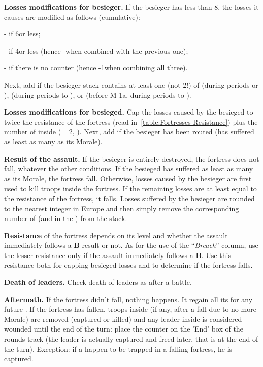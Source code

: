 \textbf{Losses modifications for besieger.} If the besieger has less than
8\LD, the losses it causes are modified as follows (cumulative):
\begin{modlist}
\item[-\texttu] if 6\LD or less;
\item[-\texttu] if 4\LD or less (hence -\texttd when combined with the
  previous one);
\item[-\texttd] if there is no \ARMY counter (hence -1\texttu when combining
  all three).
\end{modlist}
Next, add \texttd if the besieger stack contains at least one \ARMY\faceplus
(not 2\ARMY\facemoins !) of \POL (during periods  or ),
\RUS (during periods  to ), or \TUR \Janissaire (before
M-1a, during periods  to ).


\textbf{Losses modifications for besieged.} Cap the losses caused by the
besieged to twice the resistance of the fortress (read
in~\ref{table:Fortresses Resistance}) plus the number of \LD inside
(\ARMY\facemoins = 2\LD, \ARMY{}\LD). Next, add \texttd if the
besieger has been routed (has suffered as least as many \textetoile as its
Morale).

\textbf{Result of the assault.} If the besieger is entirely destroyed, the
fortress does not fall, whatever the other conditions. If the besieged has
suffered as least as many \textetoile as its Morale, the fortress
fall. Otherwise, losses caused by the besieger are first used to kill troops
inside the fortress. If the remaining losses are at least equal to the
resistance of the fortress, it falls. Losses suffered by the besieger are
rounded to the nearest integer in Europe and then simply remove the
corresponding number of \LD (and \LDE in the \ROTW) from the stack.

\textbf{Resistance} of the fortress depends on its level and whether the
assault immediately follows a \textbf{B} result or not. As for the use of the
``\emph{Breach}'' column, use the lesser resistance only if the assault
immediately follows a \textbf{B}. Use this resistance both for capping
besieged losses and to determine if the fortress falls.

\textbf{Death of leaders.} Check death of leaders as after a battle.

\textbf{Aftermath.} If the fortress didn't fall, nothing happens. It regain
all its  for any future . If the fortress has
fallen, troops inside (if any, after a fall due to no more Morale) are removed
(captured or killed) and any leader inside is considered wounded until the end
of the turn: place the counter on the 'End' box of the rounds track (the
leader is actually captured and freed later, that is at the end of the turn).
Exception: if a  happen to be trapped in a falling fortress, he
is captured.

